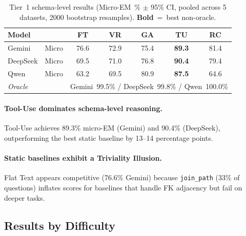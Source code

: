 \begin{table}[t]
\centering
\caption{Tier~1 schema-level results (Micro-EM~\% $\pm$ 95\% CI,
pooled across 5 datasets, 2000 bootstrap resamples).
\textbf{Bold}~=~best non-oracle.}
\label{tab:main-results}
\begin{tabular}{llccccc}
\toprule
Model & & FT & VR & GA & TU & RC \\
\midrule
Gemini & Micro & 76.6 & 72.9
  & 75.4 & \textbf{89.3}
  & 81.4 \\
\midrule
DeepSeek & Micro & 69.5 & 71.0
  & 76.8 & \textbf{90.4}
  & 79.4 \\
\midrule
Qwen & Micro & 63.2 & 69.5
  & 80.9 & \textbf{87.5}
  & 64.6 \\
\midrule
\textit{Oracle} & & \multicolumn{5}{c}{%
  Gemini~99.5\% / DeepSeek~99.8\% / Qwen~100.0\%} \\
\bottomrule
\end{tabular}
\end{table}

\paragraph{Tool-Use dominates schema-level reasoning.}
Tool-Use achieves 89.3\% micro-EM (Gemini) and 90.4\% (DeepSeek),
outperforming the best static baseline by 13--14 percentage
points.

\paragraph{Static baselines exhibit a Triviality Illusion.}
Flat Text appears competitive (76.6\% Gemini) because \texttt{join\_path}
(33\% of questions) inflates scores for baselines that handle FK
adjacency but fail on deeper tasks.

\subsection{Results by Difficulty}

